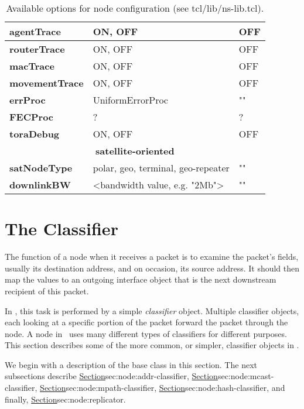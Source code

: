 \begin{table}[ht]
\begin{center}
{\begin{tabular}{|l|l|l|}
{\bf agentTrace} & ON, OFF & OFF \\\hline
{\bf routerTrace} & ON, OFF & OFF \\\hline
{\bf macTrace} & ON, OFF & OFF \\\hline
{\bf movementTrace} & ON, OFF & OFF \\\hline
{\bf errProc} & UniformErrorProc & "" \\\hline
{\bf FECProc} &? & ? \\\hline
{\bf toraDebug} & ON, OFF & OFF \\\hline
\multicolumn{3}{|c|}{\bf satellite-oriented} \\\hline
{\bf satNodeType} & polar, geo, terminal, geo-repeater & "" \\\hline
{\bf downlinkBW} & <bandwidth value, e.g. "2Mb"> & ""\\\hline
\end{tabular}
}
\end{center}
\caption{Available options for node configuration (see tcl/lib/ns-lib.tcl).
}
\end{table}
\normalsize

\section{The Classifier}
\label{sec:node:classifiers}

The function of a node when it receives a packet is to examine
the packet's fields, usually its destination address, and
on occasion, its source address.
It should then map the values to an outgoing interface object
that is the next downstream recipient of this packet.

In \ns, this task is performed by a simple \emph{classifier} object.
Multiple classifier objects,
each looking at a specific portion of the packet
forward the packet through the node.
A node in \ns\ uses many different types of classifiers for different purposes.
This section describes some of the more common, or simpler,
classifier objects in \ns.

We begin with a description of the base class in this section.
The next subsections describe
\href{the address classifier}{Section}{sec:node:addr-classifier},
\href{the multicast classifier}{Section}{sec:node:mcast-classifier},
\href{the multipath classifier}{Section}{sec:node:mpath-classifier}, 
\href{the hash classifier}{Section}{sec:node:hash-classifier}, and
finally, \href{the replicator}{Section}{sec:node:replicator}.

